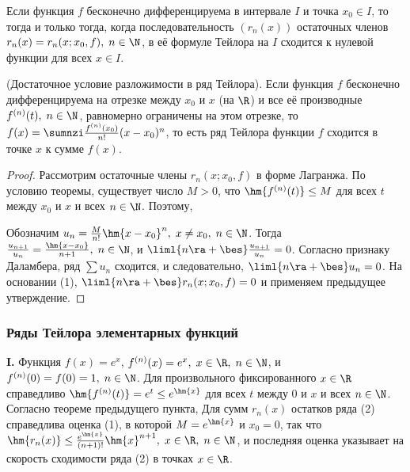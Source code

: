 \documentclass[a4paper]{article}
\newenvironment{stm*}{\par\vskip\theoremskip\textbf{Утверждение.}\normalfont \itshape}{\par\vskip\theoremskip}
\begin{document}
\begin{stm*}
Если функция $f$ бесконечно дифференцируема в интервале $I$ и точка
$x_0\in I$, то  тогда и только тогда, когда последовательность
$(r_n(x))$ остаточных членов $r_n(x) = r_n(x;x_0,f), \; n\in\N$, в
её формуле Тейлора на $I$ сходится к нулевой функции для всех $x\in
I$.
\end{stm*}

\begin{theorem}
(Достаточное условие разложимости в ряд Тейлора). Если функция $f$
бесконечно дифференцируема на отрезке между $x_0$ и $x$ (на $\R$) и
все её производные $f^{(n)}(t), \; n\in\N$, равномерно ограничены на
этом отрезке, то $f(x)=\sumnzi \frac{f^{(n)}(x_0)}{n!} (x-x_0)^n$,
то есть ряд Тейлора функции $f$ сходится в точке $x$ к сумме $f(x)$.
\end{theorem}

\begin{proof}
Рассмотрим остаточные члены $r_n(x;x_0,f)$ в форме Лагранжа.
 По условию теоремы, существует число
$M>0$, что $\hm{f^{(n)}(t)}\le M$ для всех $t$ между $x_0$ и $x$ и
всех $n\in\N$. Поэтому, 

Обозначим $u_n = \frac{M}{n!} \hm{x-x_0}^n, \; x\ne x_0, \; n\in\N$.
Тогда $\frac{u_{n+1}}{u_n} = \frac{\hm{x-x_0}}{n+1}, \; n\in\N$, и
$\liml{n\ra+\bes} \frac{u_{n+1}}{u_n}=0$. Согласно признаку
Даламбера, ряд $\sum u_n$ сходится, и следовательно,
$\liml{n\ra+\bes}u_n=0$. На основании (1), $\liml{n\ra+\bes}
r_n(x;x_0,f)=0$ и применяем предыдущее утверждение.
\end{proof}

\subsubsection{Ряды Тейлора элементарных функций}

\textbf{I.} Функция $f(x)=e^x$, $f^{(n)}(x)=e^x, \; x\in\R, \;
n\in\N$, и $f^{(n)}(0)=f(0)=1, \; n\in\N$. Для произвольного
фиксированного $x\in\R$ справедливо $\hm{f^{(n)}(t)}=e^t \le
e^{\hm{x}}$ для всех $t$ между $0$ и $x$ и всех $n\in\N$. Согласно
теореме предыдущего пункта, 
Для сумм $r_n(x)$ остатков ряда (2) справедлива оценка (1), в
которой $M=e^{\hm{x}}$ и $x_0=0$, так что $\hm{r_n(x)} \le
\frac{e^{\hm{x}}}{(n+1)!} \hm{x}^{n+1}, \; x\in\R, \; n\in\N$, и
последняя оценка указывает на скорость сходимости ряда (2) в  точках
$x\in\R$.
\end{document}
